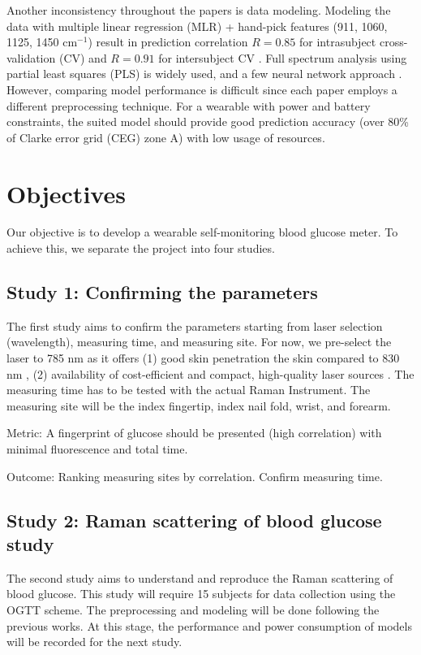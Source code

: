 Another inconsistency throughout the papers is data modeling.
Modeling the data with multiple linear regression (MLR) + hand-pick features (911, 1060, 1125, 1450 $\text{cm}^{-1}$) result in prediction correlation $R = 0.85$ for intrasubject cross-validation (CV) and $R = 0.91$ for intersubject CV \citep{directGlucose}.
Full spectrum analysis using partial least squares (PLS) \citep{forearm2014, sitecompare, forearm2005, directGlucose} is widely used, and a few neural network approach \citep{ramanNailFold2019, sitecompare}.
However, comparing model performance is difficult since each paper employs a different preprocessing technique.
For a wearable with power and battery constraints, the suited model should provide good prediction accuracy (over 80\% of Clarke error grid (CEG) zone A) with low usage of resources.

\section{Objectives}

Our objective is to develop a wearable self-monitoring blood glucose meter. To achieve this, we separate the project into four studies.

\subsection{Study 1: Confirming the parameters}

The first study aims to confirm the parameters starting from laser selection (wavelength), measuring time, and measuring site.
For now, we pre-select the laser to 785 nm as it offers (1) good skin penetration the skin compared to 830 nm \citep{opticalBest}, (2) availability of cost-efficient and compact, high-quality laser sources \citep{785good}.
The measuring time has to be tested with the actual Raman Instrument.
The measuring site will be the index fingertip, index nail fold, wrist, and forearm.

Metric: A fingerprint of glucose should be presented (high correlation) with minimal fluorescence and total time.

Outcome: Ranking measuring sites by correlation. Confirm measuring time.
\subsection{Study 2: Raman scattering of blood glucose study}
\label{intro-s2}

The second study aims to understand and reproduce the Raman scattering of blood glucose.
This study will require 15 subjects for data collection using the OGTT scheme.
The preprocessing and modeling will be done following the previous works.
At this stage, the performance and power consumption of models will be recorded for the next study.

